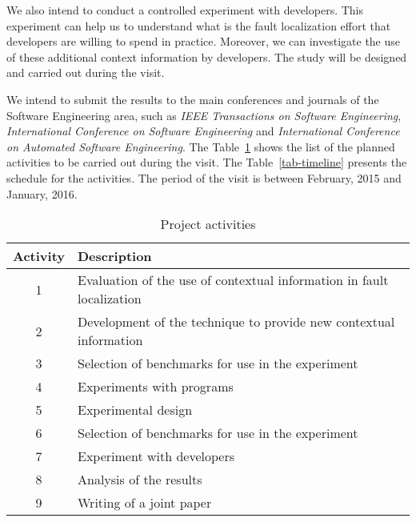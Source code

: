 \documentclass[12pt,a4paper,espaco=umemeio,noindentfirst,oneside,openany,tocpage=plain,pnumromarab,ruledheader,time,anapcustomindent]{sty/abnt}
\begin{document}
We also intend to conduct a controlled experiment with developers. This experiment can help us to understand what is the fault localization effort that developers 
are willing to spend in practice. Moreover, we can investigate the use of these additional context information by developers. The study will be designed and carried out 
during the visit. 

We intend to submit the results to the main conferences and journals of the Software Engineering area, such as \textit{IEEE Transactions on Software Engineering}, 
\textit{International Conference on Software Engineering} and \textit{International Conference on Automated Software Engineering}. The Table~\ref{tab-activities} shows 
the list of the planned activities to be carried out during the visit. The Table~\ref{tab-timeline} presents the schedule for the activities. The period of the visit 
is between February, 2015 and January, 2016.

\begin{table}[h]
\caption{Project activities}
\label{tab-activities}
\centering
\begin{tabular}{|c|l|}
\hline Activity & Description \\
\hline 1 & Evaluation of the use of contextual information in fault localization\\
\hline 2 & Development of the technique to provide new contextual information\\
\hline 3 & Selection of benchmarks for use in the experiment\\
\hline 4 & Experiments with programs\\
\hline 5 & Experimental design\\
\hline 6 & Selection of benchmarks for use in the experiment\\
\hline 7 & Experiment with developers\\
\hline 8 & Analysis of the results\\
\hline 9 & Writing of a joint paper\\
\hline
\end{tabular}
\end{table}
\end{document}
